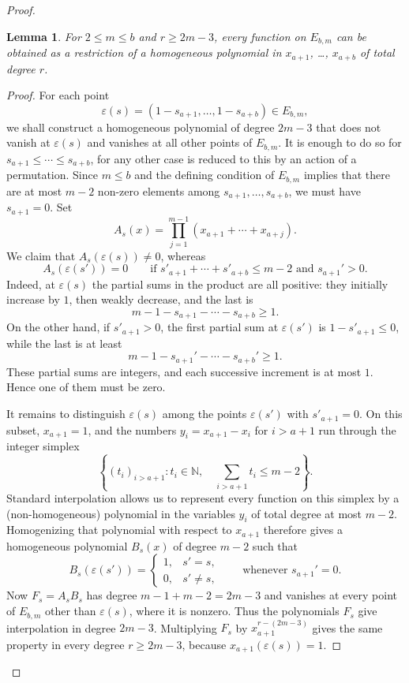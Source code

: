 \documentclass[11pt,reqno]{amsart}
\theoremstyle{plain}
\newtheorem{lemma}[theorem]{Lemma}
\theoremstyle{definition}
\theoremstyle{remark}
\begin{document}
\begin{proof}
\begin{lemma}\label{lm:restriction-homogen}
For $2\le m\le b$ and $r\ge 2m-3$, every function on $E_{b,m}$ can be obtained as a restriction of a homogeneous polynomial in $x_{a+1}$, \ldots, $x_{a+b}$ of total degree $r$. 
\end{lemma}

\begin{proof}
For each point 
 \[
 \varepsilon(s)=(1-s_{a+1},\ldots,1-s_{a+b})\in E_{b,m},  
 \]
we shall construct a homogeneous polynomial of degree $2m-3$ that does not vanish at $\varepsilon(s)$ and vanishes at all other points of $E_{b,m}$. It is enough to do so for $s_{a+1}\le \cdots\le s_{a+b}$, for any other case is reduced to this by an action of a permutation. Since $m\le b$ and the defining condition of $E_{b,m}$ implies that there are at most $m-2$ non-zero elements among $s_{a+1},\ldots,s_{a+b}$, we must have $s_{a+1}=0$. Set
 \[
A_s(x)=\prod_{j=1}^{m-1}(x_{a+1}+\cdots+x_{a+j}).
 \]
We claim that $A_s(\varepsilon(s))\ne0$, whereas
 \[
A_s(\varepsilon(s'))=0 \qquad\text{if } s'_{a+1}+\cdots+s'_{a+b}\le m-2
 \text{ and }s_{a+1}'>0.
\]
Indeed, at $\varepsilon(s)$ the partial sums in the product are all positive: they initially increase by $1$, then weakly decrease, and the
last is 
 \[
m-1-s_{a+1}-\cdots-s_{a+b}\ge1.     
 \]
On the other hand, if $s'_{a+1}>0$, the first partial sum at $\varepsilon(s')$ is $1-s'_{a+1}\le0$, while the last is at least 
 \[
m-1-s_{a+1}'-\cdots-s_{a+b}'\ge1.     
 \]
These partial sums are integers, and each successive increment is at most $1$. Hence one of them must be zero.

It remains to distinguish $\varepsilon(s)$ among the points $\varepsilon(s')$ with $s'_{a+1}=0$. On this subset, $x_{a+1}=1$, and the numbers
$y_i=x_{a+1}-x_i$ for $i>{a+1}$ run through the integer simplex
 \[
\left\{(t_i)_{i>{a+1}}\colon t_i\in\mathbb N,\quad
 \sum_{i>{a+1}}t_i\le m-2\right\}.
 \]
Standard interpolation allows us to represent every function on this simplex by a (non-homogeneous) polynomial in the variables $y_i$ of total degree at most $m-2$. Homogenizing that polynomial with respect to $x_{a+1}$ therefore gives a homogeneous polynomial $B_s(x)$ of degree $m-2$ such that
 \[
 B_s(\varepsilon(s'))=\begin{cases}
 1,&s'=s,\\
 0,&s'\ne s,
 \end{cases}
 \qquad\text{whenever }s_{a+1}'=0.
 \]
Now $F_s=A_sB_s$ has degree $m-1+m-2=2m-3$ and vanishes at every point of $E_{b,m}$ other than $\varepsilon(s)$, where it is nonzero.
Thus the polynomials $F_s$ give interpolation in degree $2m-3$. Multiplying $F_s$ by $x_{a+1}^{r-(2m-3)}$ gives the same property
in every degree $r\ge 2m-3$, because $x_{a+1}(\varepsilon(s))=1$. 
\end{proof}


\end{proof}
\end{document}
